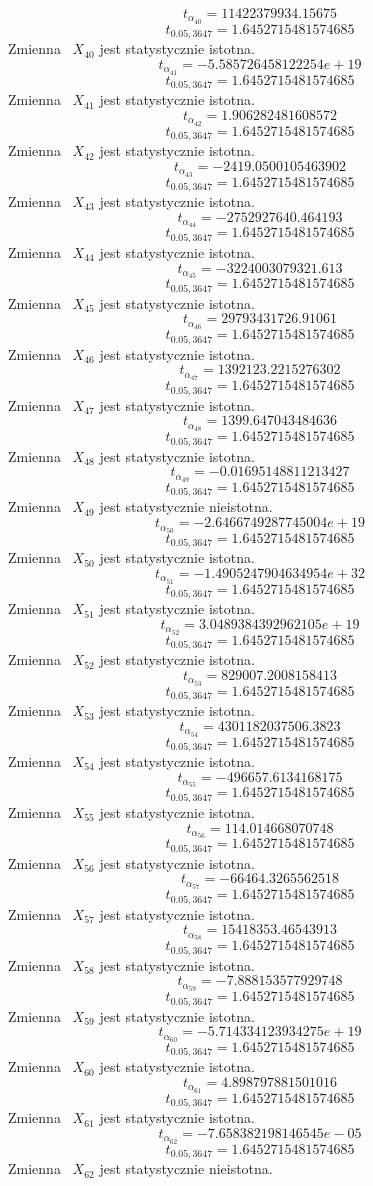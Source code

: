 \[t_{\alpha_{40}} = 11422379934.15675\]
\[t_{0.05, 3647} = 1.6452715481574685\]
Zmienna ~$X_{40}$ jest statystycznie istotna.
\[t_{\alpha_{41}} = -5.585726458122254e+19\]
\[t_{0.05, 3647} = 1.6452715481574685\]
Zmienna ~$X_{41}$ jest statystycznie istotna.
\[t_{\alpha_{42}} = 1.906282481608572\]
\[t_{0.05, 3647} = 1.6452715481574685\]
Zmienna ~$X_{42}$ jest statystycznie istotna.
\[t_{\alpha_{43}} = -2419.0500105463902\]
\[t_{0.05, 3647} = 1.6452715481574685\]
Zmienna ~$X_{43}$ jest statystycznie istotna.
\[t_{\alpha_{44}} = -2752927640.464193\]
\[t_{0.05, 3647} = 1.6452715481574685\]
Zmienna ~$X_{44}$ jest statystycznie istotna.
\[t_{\alpha_{45}} = -3224003079321.613\]
\[t_{0.05, 3647} = 1.6452715481574685\]
Zmienna ~$X_{45}$ jest statystycznie istotna.
\[t_{\alpha_{46}} = 29793431726.91061\]
\[t_{0.05, 3647} = 1.6452715481574685\]
Zmienna ~$X_{46}$ jest statystycznie istotna.
\[t_{\alpha_{47}} = 1392123.2215276302\]
\[t_{0.05, 3647} = 1.6452715481574685\]
Zmienna ~$X_{47}$ jest statystycznie istotna.
\[t_{\alpha_{48}} = 1399.647043484636\]
\[t_{0.05, 3647} = 1.6452715481574685\]
Zmienna ~$X_{48}$ jest statystycznie istotna.
\[t_{\alpha_{49}} = -0.01695148811213427\]
\[t_{0.05, 3647} = 1.6452715481574685\]
Zmienna ~$X_{49}$ jest statystycznie nieistotna.
\[t_{\alpha_{50}} = -2.6466749287745004e+19\]
\[t_{0.05, 3647} = 1.6452715481574685\]
Zmienna ~$X_{50}$ jest statystycznie istotna.
\[t_{\alpha_{51}} = -1.4905247904634954e+32\]
\[t_{0.05, 3647} = 1.6452715481574685\]
Zmienna ~$X_{51}$ jest statystycznie istotna.
\[t_{\alpha_{52}} = 3.0489384392962105e+19\]
\[t_{0.05, 3647} = 1.6452715481574685\]
Zmienna ~$X_{52}$ jest statystycznie istotna.
\[t_{\alpha_{53}} = 829007.2008158413\]
\[t_{0.05, 3647} = 1.6452715481574685\]
Zmienna ~$X_{53}$ jest statystycznie istotna.
\[t_{\alpha_{54}} = 4301182037506.3823\]
\[t_{0.05, 3647} = 1.6452715481574685\]
Zmienna ~$X_{54}$ jest statystycznie istotna.
\[t_{\alpha_{55}} = -496657.6134168175\]
\[t_{0.05, 3647} = 1.6452715481574685\]
Zmienna ~$X_{55}$ jest statystycznie istotna.
\[t_{\alpha_{56}} = 114.014668070748\]
\[t_{0.05, 3647} = 1.6452715481574685\]
Zmienna ~$X_{56}$ jest statystycznie istotna.
\[t_{\alpha_{57}} = -66464.3265562518\]
\[t_{0.05, 3647} = 1.6452715481574685\]
Zmienna ~$X_{57}$ jest statystycznie istotna.
\[t_{\alpha_{58}} = 15418353.46543913\]
\[t_{0.05, 3647} = 1.6452715481574685\]
Zmienna ~$X_{58}$ jest statystycznie istotna.
\[t_{\alpha_{59}} = -7.888153577929748\]
\[t_{0.05, 3647} = 1.6452715481574685\]
Zmienna ~$X_{59}$ jest statystycznie istotna.
\[t_{\alpha_{60}} = -5.714334123934275e+19\]
\[t_{0.05, 3647} = 1.6452715481574685\]
Zmienna ~$X_{60}$ jest statystycznie istotna.
\[t_{\alpha_{61}} = 4.898797881501016\]
\[t_{0.05, 3647} = 1.6452715481574685\]
Zmienna ~$X_{61}$ jest statystycznie istotna.
\[t_{\alpha_{62}} = -7.658382198146545e-05\]
\[t_{0.05, 3647} = 1.6452715481574685\]
Zmienna ~$X_{62}$ jest statystycznie nieistotna.
